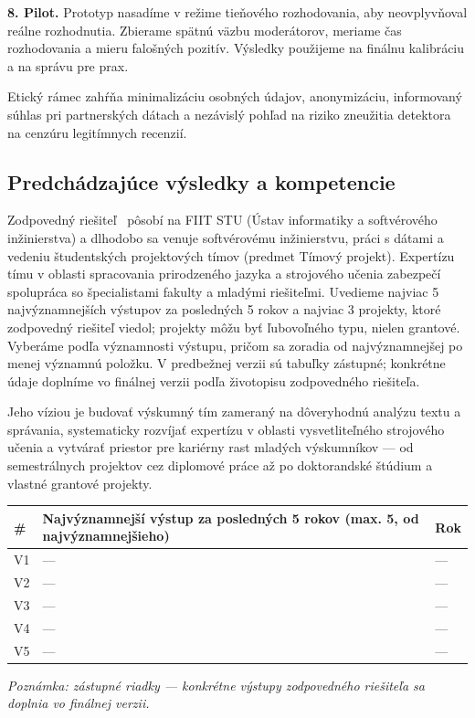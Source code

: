 \documentclass[11pt,a4paper]{article}
\begin{document}
\textbf{8. Pilot.} Prototyp nasadíme v režime tieňového rozhodovania, aby neovplyvňoval reálne rozhodnutia. Zbierame spätnú väzbu moderátorov, meriame čas rozhodovania a mieru falošných pozitív. Výsledky použijeme na finálnu kalibráciu a na správu pre prax.

Etický rámec zahŕňa minimalizáciu osobných údajov, anonymizáciu, informovaný súhlas pri partnerských dátach a nezávislý pohľad na riziko zneužitia detektora na cenzúru legitímnych recenzií.

\subsection{Predchádzajúce výsledky a kompetencie}

Zodpovedný riešiteľ \piName\ pôsobí na FIIT STU (Ústav informatiky a softvérového inžinierstva) a dlhodobo sa venuje softvérovému inžinierstvu, práci s dátami a vedeniu študentských projektových tímov (predmet Tímový projekt). Expertízu tímu v oblasti spracovania prirodzeného jazyka a strojového učenia zabezpečí spolupráca so špecialistami fakulty a mladými riešiteľmi. Uvedieme najviac 5 najvýznamnejších výstupov za posledných 5 rokov a najviac 3 projekty, ktoré zodpovedný riešiteľ viedol; projekty môžu byť ľubovoľného typu, nielen grantové. Vyberáme podľa významnosti výstupu, pričom sa zoradia od najvýznamnejšej po menej významnú položku. V predbežnej verzii sú tabuľky zástupné; konkrétne údaje doplníme vo finálnej verzii podľa životopisu zodpovedného riešiteľa.

Jeho víziou je budovať výskumný tím zameraný na dôveryhodnú analýzu textu a správania, systematicky rozvíjať expertízu v oblasti vysvetliteľného strojového učenia a vytvárať priestor pre kariérny rast mladých výskumníkov — od semestrálnych projektov cez diplomové práce až po doktorandské štúdium a vlastné grantové projekty.

\begin{table}[h!]
\centering
\small
\begin{tabularx}{\textwidth}{@{}p{0.8cm} X p{2.0cm}@{}}
\toprule
\# & Najvýznamnejší výstup za posledných 5 rokov (max. 5, od najvýznamnejšieho) & Rok \\
\midrule
V1 & --- & --- \\
V2 & --- & --- \\
V3 & --- & --- \\
V4 & --- & --- \\
V5 & --- & --- \\
\bottomrule
\end{tabularx}
\smallskip
\emph{Poznámka: zástupné riadky — konkrétne výstupy zodpovedného riešiteľa sa doplnia vo finálnej verzii.}
\end{table}
\end{document}
